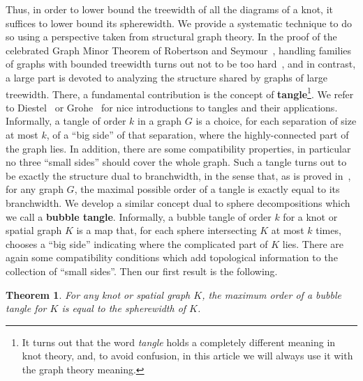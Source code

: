 \documentclass[11pt,a4paper]{article}
\newtheorem{theorem}{Theorem}[section]
\begin{document}
Thus, in order to lower bound the treewidth of all the diagrams of a knot, it suffices to lower bound its spherewidth. We provide a systematic technique to do so using a perspective taken from structural graph theory. In the proof of the celebrated Graph Minor Theorem of Robertson and Seymour~\cite{Graph_Minors_XX}, handling families of graphs with bounded treewidth turns out not to be too hard~\cite{Graph_Minors_V}, and in contrast, a large part is devoted to analyzing the structure shared by graphs of large treewidth. There, a fundamental contribution is the concept of \textbf{tangle}\footnote{It turns out that the word \emph{tangle} holds a completely different meaning in knot theory, and, to avoid confusion, in this article we will always use it with the graph theory meaning.}. We refer to Diestel~\cite{monalisa} or Grohe~\cite{grohetangles} for nice introductions to tangles and their applications. Informally, a tangle of order $k$ in a graph $G$ is a choice, for each separation of size at most $k$, of a ``big side'' of that separation, where the highly-connected part of the graph lies. In addition, there are some compatibility properties, in particular no three ``small sides'' should cover the whole graph. Such a tangle turns out to be exactly the structure dual to branchwidth, in the sense that, as is proved in~\cite{Graph_Minors_X}, for any graph $G$, the maximal possible order of a tangle is exactly equal to its branchwidth. We develop a similar concept dual to sphere decompositions which we call a \textbf{bubble tangle}. Informally, a bubble tangle of order $k$ for a knot or spatial graph $K$ is a map that, for each sphere intersecting $K$ at most $k$ times, chooses a ``big side'' indicating where the complicated part of $K$ lies. There are again some compatibility conditions which add topological information to the collection of ``small sides''. Then our first result is the following. 

\begin{theorem}\label{T:duality}
For any knot or spatial graph $K$, the maximum order of a bubble tangle for $K$ is equal to the spherewidth of $K$.
\end{theorem}
\end{document}
